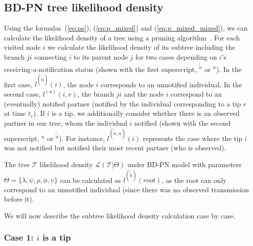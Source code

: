 \documentclass[a4paper,10pt]{article}
\begin{document}
\subsection{BD-PN tree likelihood density} 

Using the formulas~(\ref{eq:ps}), (\ref{eq:p_mixed}) and (\ref{eq:p_mixed_mixed}), we can calculate the likelihood density of a tree using a pruning algorithm~\citep{10.1093/sysbio/22.3.240}. For each visited node $i$ we calculate the likelihood density of its subtree including the branch $ji$ connecting $i$ to its parent node $j$ for two cases depending on $i$'s receiving-a-notification status (shown with the first superscript, $^{\not{n}}$ or $^n$). In the first case,  $l^{(\not{n})}(i)$, the node $i$ corresponds to an unnotified individual. In the second case, $l^{(n)}(i, r)$, the branch $ji$ and the node $i$ correspond to an (eventually) notified partner (notified by the individual corresponding to a tip $r$ at time $t_r$). If $i$ is a tip, we additionally consider whether there is an observed partner in our tree, whom the individual $i$ notified  (shown with the second superscript, $^n$ or $^{\not{n}}$). For instance, $l^{(\not{n},n)}(i)$ represents the case where the tip $i$ was not notified but notified their most recent partner (who is observed). %

The tree $\mathscr{T}$ likelihood density $\mathscr{L}(\mathscr{T}|\Theta)$ under BD-PN model with parameters $\Theta=\{\lambda, \psi, \rho, \phi, \upsilon\}$ can be calculated as $l^{(\not{n})}(root)$, as the root can only correspond to an unnotified individual (since there was no observed transmission before it).

We will now describe the subtree likelihood density calculation case by case.

\subsubsection*{Case 1: $i$ is a tip} 
\end{document}
